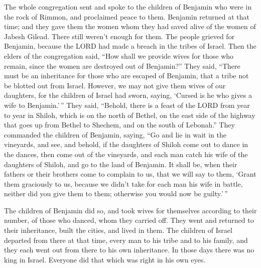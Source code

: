  The whole congregation sent and spoke to the children of
Benjamin who were in the rock of Rimmon, and proclaimed peace to them.
 Benjamin returned at that time; and they gave them the
women whom they had saved alive of the women of Jabesh Gilead. There
still weren't enough for them.  The people grieved for
Benjamin, because the LORD had made a breach in the tribes of Israel.
 Then the elders of the congregation said, ``How shall we
provide wives for those who remain, since the women are destroyed out of
Benjamin?''  They said, ``There must be an inheritance for
those who are escaped of Benjamin, that a tribe not be blotted out from
Israel.  However, we may not give them wives of our
daughters, for the children of Israel had sworn, saying, `Cursed is he
who gives a wife to Benjamin.'\,''  They said, ``Behold,
there is a feast of the LORD from year to year in Shiloh, which is on
the north of Bethel, on the east side of the highway that goes up from
Bethel to Shechem, and on the south of Lebonah.''  They
commanded the children of Benjamin, saying, ``Go and lie in wait in the
vineyards,  and see, and behold, if the daughters of Shiloh
come out to dance in the dances, then come out of the vineyards, and
each man catch his wife of the daughters of Shiloh, and go to the land
of Benjamin.  It shall be, when their fathers or their
brothers come to complain to us, that we will say to them, `Grant them
graciously to us, because we didn't take for each man his wife in
battle, neither did you give them to them; otherwise you would now be
guilty.'\,''

 The children of Benjamin did so, and took wives for
themselves according to their number, of those who danced, whom they
carried off. They went and returned to their inheritance, built the
cities, and lived in them.  The children of Israel departed
from there at that time, every man to his tribe and to his family, and
they each went out from there to his own inheritance.  In
those days there was no king in Israel. Everyone did that which was
right in his own eyes.
